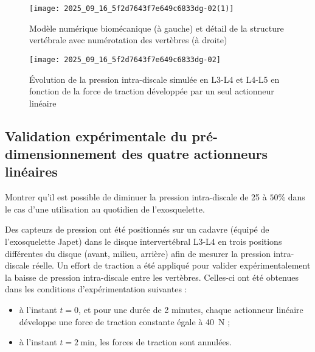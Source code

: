 \begin{figure}[!h]
\centering
\texttt{[image: 2025\_09\_16\_5f2d7643f7e649c6833dg-02(1)]}
\caption{\label{ccs_mp_2023_fig_02}  Modèle numérique biomécanique (à gauche) et détail de la structure vertébrale avec numérotation des vertèbres (à droite)}
\end{figure}



%

\begin{figure}[!h]
\centering
\texttt{[image: 2025\_09\_16\_5f2d7643f7e649c6833dg-02]}
\caption{\label{ccs_mp_2023_fig_03}  Évolution de la pression intra-discale simulée en L3-L4 et L4-L5 en fonction de la force de traction développée par un seul actionneur linéaire}
\end{figure}




\subsection{Validation expérimentale du pré-dimensionnement des quatre actionneurs linéaires}
\begin{obj}
Montrer qu'il est possible de diminuer la pression intra-discale de 25 à $50 \%$ dans le cas d'une utilisation au quotidien de l'exosquelette.
\end{obj}

Des capteurs de pression ont été positionnés sur un cadavre (équipé de l'exosquelette Japet) dans le disque intervertébral L3-L4 en trois positions différentes du disque (avant, milieu, arrière) afin de mesurer la pression intra-discale réelle. Un effort de traction a été appliqué pour valider expérimentalement la baisse de pression intra-discale entre les vertèbres. Celles-ci ont été obtenues dans les conditions d'expérimentation suivantes :

\begin{itemize}
  \item à l'instant $t=0$, et pour une durée de 2 minutes, chaque actionneur linéaire développe une force de traction constante égale à \SI{40}{N} ;
  \item à l'instant $t=2 \mathrm{~min}$, les forces de traction sont annulées.
\end{itemize}


